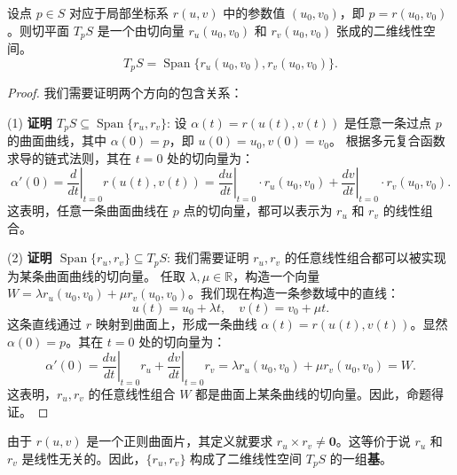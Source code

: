 \documentclass[lang=cn,10pt,thmcnt=section]{elegantbook}
\renewcommand{\vec}[1]{\mathbf{#1}}
\begin{document}
\begin{proposition}
    设点 $p \in S$ 对应于局部坐标系 $r(u,v)$ 中的参数值 $(u_0, v_0)$，即 $p=r(u_0, v_0)$。则切平面 $T_p S$ 是一个由切向量 $r_u(u_0, v_0)$ 和 $r_v(u_0, v_0)$ 张成的二维线性空间。
    \[
    T_p S = \operatorname{Span}\{ r_u(u_0, v_0), r_v(u_0, v_0) \}.
    \]
\end{proposition}
\begin{proof}
    我们需要证明两个方向的包含关系：
    
    \noindent (1) \textbf{证明 $T_p S \subseteq \operatorname{Span}\{r_u, r_v\}$}:
    设 $\alpha(t) = r(u(t), v(t))$ 是任意一条过点 $p$ 的曲面曲线，其中 $\alpha(0) = p$，即 $u(0)=u_0, v(0)=v_0$。
    根据多元复合函数求导的链式法则，其在 $t=0$ 处的切向量为：
    \[
    \alpha'(0) = \left. \frac{d}{dt} \right|_{t=0} r(u(t), v(t)) = \left. \frac{du}{dt} \right|_{t=0} \cdot r_u(u_0, v_0) + \left. \frac{dv}{dt} \right|_{t=0} \cdot r_v(u_0, v_0).
    \]
    这表明，任意一条曲面曲线在 $p$ 点的切向量，都可以表示为 $r_u$ 和 $r_v$ 的线性组合。
    
    \noindent (2) \textbf{证明 $\operatorname{Span}\{r_u, r_v\} \subseteq T_p S$}:
    我们需要证明 $r_u, r_v$ 的任意线性组合都可以被实现为某条曲面曲线的切向量。
    任取 $\lambda, \mu \in \mathbb{R}$，构造一个向量 $W = \lambda r_u(u_0, v_0) + \mu r_v(u_0, v_0)$。我们现在构造一条参数域中的直线：
    \[
    u(t) = u_0 + \lambda t, \quad v(t) = v_0 + \mu t.
    \]
    这条直线通过 $r$ 映射到曲面上，形成一条曲线 $\alpha(t) = r(u(t), v(t))$。显然 $\alpha(0)=p$。其在 $t=0$ 处的切向量为：
    \[
    \alpha'(0) = \left. \frac{du}{dt} \right|_{t=0} r_u + \left. \frac{dv}{dt} \right|_{t=0} r_v = \lambda r_u(u_0, v_0) + \mu r_v(u_0, v_0) = W.
    \]
    这表明，$r_u, r_v$ 的任意线性组合 $W$ 都是曲面上某条曲线的切向量。因此，命题得证。
\end{proof}

\begin{remark}
    由于 $r(u,v)$ 是一个正则曲面片，其定义就要求 $r_u \times r_v \neq \vec{0}$。这等价于说 $r_u$ 和 $r_v$ 是线性无关的。因此，$\{r_u, r_v\}$ 构成了二维线性空间 $T_p S$ 的一组\textbf{基}。
\end{remark}
\end{document}
